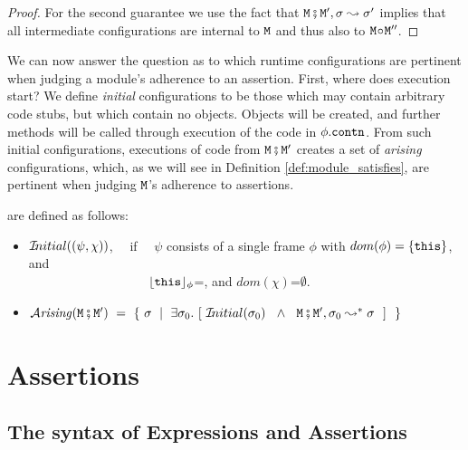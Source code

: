 \begin{proof} For the second guarantee  we use the fact that   ${\mbox{\tt{\ensuremath{{\mbox{\tt{M}}}}}}} \fatsemi {\mbox{\tt{\ensuremath{{\mbox{\tt{M}}}}}}}', \sigma \leadsto \sigma'$ implies that all
intermediate configurations are internal to ${\mbox{\tt{\ensuremath{{\mbox{\tt{M}}}}}}}$ and thus also to ${\mbox{\tt{\ensuremath{{\mbox{\tt{M}}}}}}}\!\circ\!{\mbox{\tt{\ensuremath{{\mbox{\tt{M}}}}}}}''$.
\end{proof}

We can now answer the question as to which runtime configurations are pertinent when judging a module's
adherence to an assertion.
First, where does execution start? We define {\em initial} configurations to be those which may contain arbitrary code stubs, but which contain no objects. Objects will be created, and further methods will be called through execution of the code in $\phi.{\mbox{\tt{contn}}}$. From such initial configurations, executions of code from ${\mbox{\tt{\ensuremath{{\mbox{\tt{M}}}}}}} \fatsemi {\mbox{\tt{\ensuremath{{\mbox{\tt{M}}}}}}}'$ creates a set of {\em arising} configurations, which, as we will see in Definition \ref{def:module_satisfies}, are pertinent when judging ${\mbox{\tt{\ensuremath{{\mbox{\tt{M}}}}}}}$'s  adherence to assertions.

\begin{definition} are defined as follows: \label{defn:iniial-and-arising}

\begin{itemize}
     \item
   ${{\mathcal I}\!nitial}((\psi,\chi))$, \ \ if \ \ $\psi$ consists of a single frame $\phi$ with $dom(\phi)=\{ {\mbox{\tt{this}}} \}$, and \\ %
    $\ \strut \hspace{1.2in} $ %
    ${\lfloor{ {{\mbox{\tt{this}}}}}\rfloor_{\phi}}$=\nullK, and $dom(\chi)$=$\emptyset$.
 \item
 $\Arising  {\M\mkpair\M'} \ = \ \{ \ \sigma \ \mid \ \exists \sigma_0. \ [\  \Initial{\sigma_0} \  \ \wedge\ \  \M\mkpair\M', \sigma_0 \leadsto^* \sigma \ \ ] \ \ \} $
 \end{itemize}

\end{definition}




\section{ Assertions}
\label{sect:assertions}

\subsection{The syntax of Expressions and Assertions}

